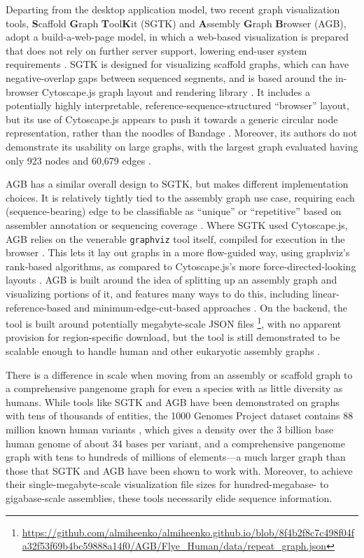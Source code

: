 Departing from the desktop application model, two recent graph visualization tools, \textbf{S}caffold \textbf{G}raph \textbf{T}ool\textbf{K}it (SGTK) and \textbf{A}ssembly \textbf{G}raph \textbf{B}rowser (AGB), adopt a build-a-web-page model, in which a web-based visualization is prepared that does not rely on further server support, lowering end-user system requirements \citep{Kunyavskaya_2018,Mikheenko_2019}.
SGTK is designed for visualizing scaffold graphs, which can have negative-overlap gaps between sequenced segments, and is based around the in-browser Cytoscape.js graph layout and rendering library \citep{Kunyavskaya_2018}.
It includes a potentially highly interpretable, reference-sequence-structured ``browser'' layout, but its use of Cytoscape.js appears to push it towards a generic circular node representation, rather than the noodles of Bandage \citep{Kunyavskaya_2018}.
Moreover, its authors do not demonstrate its usability on large graphs, with the largest graph evaluated having only 923 nodes and 60,679 edges \citep{Kunyavskaya_2018}.

AGB has a similar overall design to SGTK, but makes different implementation choices.
It is relatively tightly tied to the assembly graph use case, requiring each (sequence-bearing) edge to be classifiable as ``unique'' or ``repetitive'' based on assembler annotation or sequencing coverage \citep{Mikheenko_2019}.
Where SGTK used Cytoscape.js, AGB relies on the venerable \texttt{graphviz} tool itself, compiled for execution in the browser \citep{Mikheenko_2019, Ellson_2001}.
This lets it lay out graphs in a more flow-guided way, using graphviz's rank-based algorithms, as compared to Cytoscape.js's more force-directed-looking layouts \citep{Mikheenko_2019, Kunyavskaya_2018}.
AGB is built around the idea of splitting up an assembly graph and visualizing portions of it, and features many ways to do this, including linear-reference-based and minimum-edge-cut-based approaches \citep{Mikheenko_2019}.
On the backend, the tool is built around potentially megabyte-scale JSON files \footnote{\url{https://github.com/almiheenko/almiheenko.github.io/blob/8f4b2f8c7c498f04fa32f53f69b4bc59888a14f0/AGB/Flye_Human/data/repeat_graph.json}}, with no apparent provision for region-specific download, but the tool is still demonstrated to be scalable enough to handle human and other eukaryotic assembly graphs \citep{Mikheenko_2019}.

There is a difference in scale when moving from an assembly or scaffold graph to a comprehensive pangenome graph for even a species with as little diversity as humans.
While tools like SGTK and AGB have been demonstrated on graphs with tens of thousands of entities, the 1000 Genomes Project dataset contains 88 million known human variants \citep{1000_2015}, which gives a density over the 3 billion base human genome of about 34 bases per variant, and a comprehensive pangenome graph with tens to hundreds of millions of elements---a much larger graph than those that SGTK and AGB have been shown to work with.
Moreover, to achieve their single-megabyte-scale visualization file sizes for hundred-megabase- to gigabase-scale assemblies, these tools necessarily elide sequence information.

